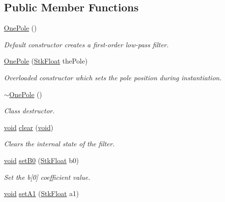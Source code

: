 \subsection*{Public Member Functions}
\begin{DoxyCompactItemize}
\item 
\hyperlink{class_nyq_1_1_one_pole_acb6891c76d0653f52c566dde33fe7f68}{One\+Pole} ()
\begin{DoxyCompactList}\small\item\em Default constructor creates a first-\/order low-\/pass filter. \end{DoxyCompactList}\item 
\hyperlink{class_nyq_1_1_one_pole_a1034b917371abf891bbffd5360d179c6}{One\+Pole} (\hyperlink{namespace_nyq_a044fa20a706520a617bbbf458a7db7e4}{Stk\+Float} the\+Pole)
\begin{DoxyCompactList}\small\item\em Overloaded constructor which sets the pole position during instantiation. \end{DoxyCompactList}\item 
\hyperlink{class_nyq_1_1_one_pole_a0919dd3731b3b4d920ae8f8a06c7de42}{$\sim$\+One\+Pole} ()
\begin{DoxyCompactList}\small\item\em Class destructor. \end{DoxyCompactList}\item 
\hyperlink{sound_8c_ae35f5844602719cf66324f4de2a658b3}{void} \hyperlink{class_nyq_1_1_one_pole_a7f3dbf6e25797bfa8d6bb7cee2862338}{clear} (\hyperlink{sound_8c_ae35f5844602719cf66324f4de2a658b3}{void})
\begin{DoxyCompactList}\small\item\em Clears the internal state of the filter. \end{DoxyCompactList}\item 
\hyperlink{sound_8c_ae35f5844602719cf66324f4de2a658b3}{void} \hyperlink{class_nyq_1_1_one_pole_a0f2ce61a2ebfbef06b3df45fa1eacef3}{set\+B0} (\hyperlink{namespace_nyq_a044fa20a706520a617bbbf458a7db7e4}{Stk\+Float} b0)
\begin{DoxyCompactList}\small\item\em Set the b\mbox{[}0\mbox{]} coefficient value. \end{DoxyCompactList}\item 
\hyperlink{sound_8c_ae35f5844602719cf66324f4de2a658b3}{void} \hyperlink{class_nyq_1_1_one_pole_a4559d761c48652af32f02eea6942af26}{set\+A1} (\hyperlink{namespace_nyq_a044fa20a706520a617bbbf458a7db7e4}{Stk\+Float} a1)

\end{DoxyCompactItemize}
